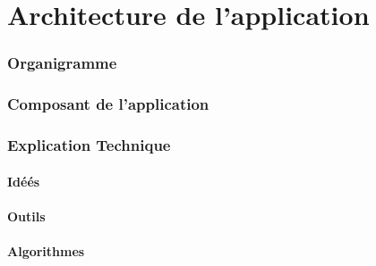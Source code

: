 \part{Architecture de l'application} %
\label{prt:architecture_ _de_ _l_'_application_}
	\section{Organigramme} %
	\label{sec:organigramme}
	

	\section{Composant de l'application} %
	\label{sec:composant_de_l_application}
	

	\section{Explication Technique} %
	\label{sec:explication_technique}
		
		\subsection{Idéés} %
		\label{sub:idéés}
		
		\subsection{Outils} %
		\label{sub:outils}
		
		\subsection{Algorithmes} %
		\label{sub:algorithmes}
		

